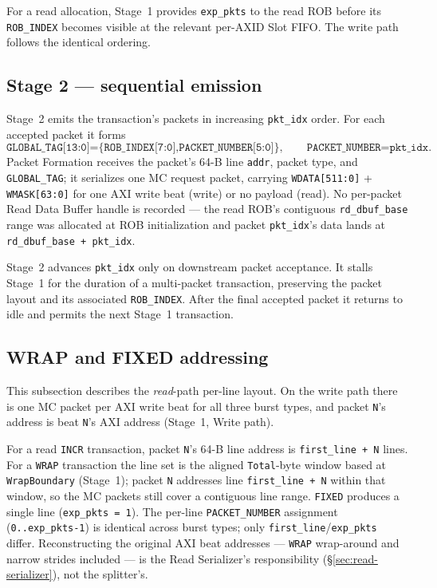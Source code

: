 For a read allocation, Stage~1 provides \texttt{exp\_pkts} to the read ROB
before its \texttt{ROB\_INDEX} becomes visible at the relevant per-AXID Slot
FIFO.  The write path follows the identical ordering.

\subsection{Stage 2 --- sequential emission}

Stage~2 emits the transaction's packets in increasing \texttt{pkt\_idx}
order.  For each accepted packet it forms
\[
 \texttt{GLOBAL\_TAG[13:0]=\{ROB\_INDEX[7:0],PACKET\_NUMBER[5:0]\}},
 \qquad \texttt{PACKET\_NUMBER=pkt\_idx}.
\]
Packet Formation receives the packet's 64-B line \texttt{addr}, packet
type, and \texttt{GLOBAL\_TAG}; it serializes one MC request packet, carrying
\texttt{WDATA[511:0]} + \texttt{WMASK[63:0]} for one AXI write beat (write) or
no payload (read).  No per-packet Read
Data Buffer handle is recorded --- the read ROB's contiguous
\texttt{rd\_dbuf\_base} range was allocated at ROB initialization and packet
\texttt{pkt\_idx}'s data lands at \texttt{rd\_dbuf\_base + pkt\_idx}.

Stage~2 advances \texttt{pkt\_idx} only on downstream packet acceptance.  It
stalls Stage~1 for the duration of a multi-packet transaction, preserving the
packet layout and its associated \texttt{ROB\_INDEX}.  After the final
accepted packet it returns to idle and permits the next Stage~1 transaction.

\subsection{WRAP and FIXED addressing}

This subsection describes the \emph{read}-path per-line layout.  On the write
path there is one MC packet per AXI write beat for all three burst types, and
packet \texttt{N}'s address is beat \texttt{N}'s AXI address (Stage~1, Write
path).

For a read \texttt{INCR} transaction, packet \texttt{N}'s 64-B line address is
\texttt{first\_line + N} lines.  For a \texttt{WRAP} transaction the line set
is the aligned \texttt{Total}-byte window based at \texttt{WrapBoundary}
(Stage~1); packet \texttt{N} addresses line \texttt{first\_line + N} within
that window, so the MC packets still cover a contiguous line range.
\texttt{FIXED} produces a single line (\texttt{exp\_pkts = 1}).  The
per-line \texttt{PACKET\_NUMBER} assignment (\texttt{0..exp\_pkts-1}) is
identical across burst types; only \texttt{first\_line}/\texttt{exp\_pkts}
differ.  Reconstructing the original AXI beat addresses --- \texttt{WRAP}
wrap-around and narrow strides included --- is the Read Serializer's
responsibility (\S\ref{sec:read-serializer}), not the splitter's.

